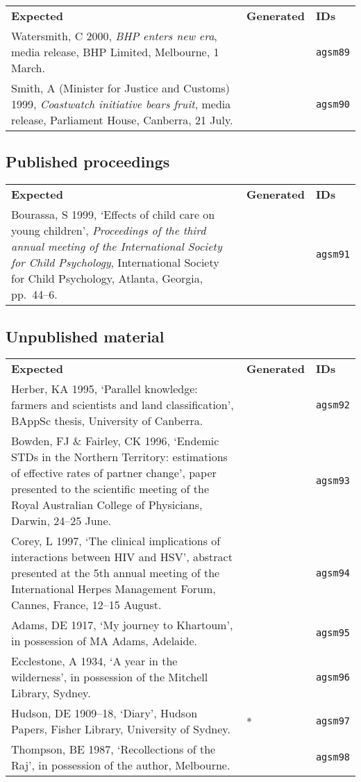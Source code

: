\documentclass[a4paper,landscape,12pt]{article}
\newlength\q
\newlength\qr
\newenvironment{citetable}
  {\noindent\begin{longtable}{p{\q} p{\q} p{\qr}}\textbf{Expected} & \textbf{Generated} & \textbf{IDs}\\}
  {\end{longtable}}
\newcommand{\trivialissue}[1]{#1 *}
\begin{document}
\begin{citetable}
	Watersmith, C 2000, \textit{BHP enters new era}, media release, BHP Limited, Melbourne, 1 March. & \fullcite{agsm89} & \texttt{agsm89} \\
	Smith, A (Minister for Justice and Customs) 1999, \textit{Coastwatch initiative bears fruit}, media release, Parliament House, Canberra, 21 July. & \fullcite{agsm90} & \texttt{agsm90} \\
\end{citetable}

\subsection{Published proceedings}

\begin{citetable}
	Bourassa, S 1999, `Effects of child care on young children', \textit{Proceedings of the third annual meeting of the International Society for Child Psychology}, International Society for Child Psychology, Atlanta, Georgia, pp.~44--6. & \fullcite{agsm91} & \texttt{agsm91} \\
\end{citetable}

\subsection{Unpublished material}

\begin{citetable}
	Herber, KA 1995, `Parallel knowledge: farmers and scientists and land classification', BAppSc thesis, University of Canberra. & \fullcite{agsm92} & \texttt{agsm92} \\
	Bowden, FJ \& Fairley, CK 1996, `Endemic STDs in the Northern Territory: estimations of effective rates of partner change', paper presented to the scientific meeting of the Royal Australian College of Physicians, Darwin, 24--25 June. & \fullcite{agsm93} & \texttt{agsm93} \\
	Corey, L 1997, `The clinical implications of interactions between HIV and HSV', abstract presented at the 5th annual meeting of the International Herpes Management Forum, Cannes, France, 12--15 August. & \fullcite{agsm94} & \texttt{agsm94} \\
	Adams, DE 1917, `My journey to Khartoum', in possession of MA Adams, Adelaide. & \fullcite{agsm95} & \texttt{agsm95} \\
	Ecclestone, A 1934, `A year in the wilderness', in possession of the Mitchell Library, Sydney. & \fullcite{agsm96} & \texttt{agsm96} \\
	Hudson, DE 1909--18, `Diary', Hudson Papers, Fisher Library, University of Sydney. & \trivialissue{\fullcite{agsm97}} & \texttt{agsm97} \\
	Thompson, BE 1987, `Recollections of the Raj', in possession of the author, Melbourne. & \fullcite{agsm98} & \texttt{agsm98} \\
\end{citetable}
\end{document}
